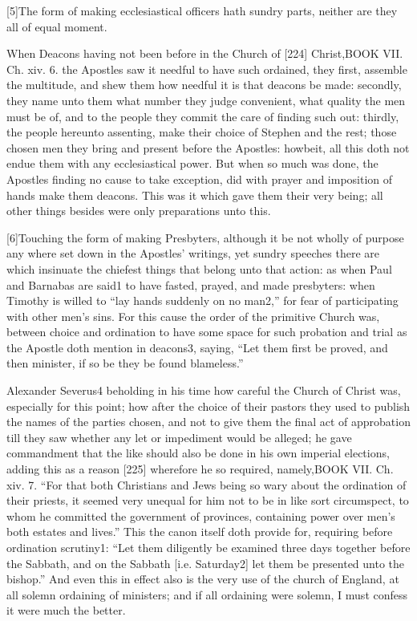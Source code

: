 [5]The form of making ecclesiastical officers hath sundry parts, neither are they all of equal moment.

When Deacons having not been before in the Church of [224] Christ,BOOK VII. Ch. xiv. 6. the Apostles saw it needful to have such ordained, they first, assemble the multitude, and shew them how needful it is that deacons be made: secondly, they name unto them what number they judge convenient, what quality the men must be of, and to the people they commit the care of finding such out: thirdly, the people hereunto assenting, make their choice of Stephen and the rest; those chosen men they bring and present before the Apostles: howbeit, all this doth not endue them with any ecclesiastical power. But when so much was done, the Apostles finding no cause to take exception, did with prayer and imposition of hands make them deacons. This was it which gave them their very being; all other things besides were only preparations unto this.

[6]Touching the form of making Presbyters, although it be not wholly of purpose any where set down in the Apostles’ writings, yet sundry speeches there are which insinuate the chiefest things that belong unto that action: as when Paul and Barnabas are said1 to have fasted, prayed, and made presbyters: when Timothy is willed to “lay hands suddenly on no man2,” for fear of participating with other men’s sins. For this cause the order of the primitive Church was, between choice and ordination to have some space for such probation and trial as the Apostle doth mention in deacons3, saying, “Let them first be proved, and then minister, if so be they be found blameless.”

Alexander Severus4 beholding in his time how careful the Church of Christ was, especially for this point; how after the choice of their pastors they used to publish the names of the parties chosen, and not to give them the final act of approbation till they saw whether any let or impediment would be alleged; he gave commandment that the like should also be done in his own imperial elections, adding this as a reason [225] wherefore he so required, namely,BOOK VII. Ch. xiv. 7. “For that both Christians and Jews being so wary about the ordination of their priests, it seemed very unequal for him not to be in like sort circumspect, to whom he committed the government of provinces, containing power over men’s both estates and lives.” This the canon itself doth provide for, requiring before ordination scrutiny1: “Let them diligently be examined three days together before the Sabbath, and on the Sabbath [i.e. Saturday2] let them be presented unto the bishop.” And even this in effect also is the very use of the church of England, at all solemn ordaining of ministers; and if all ordaining were solemn, I must confess it were much the better.

